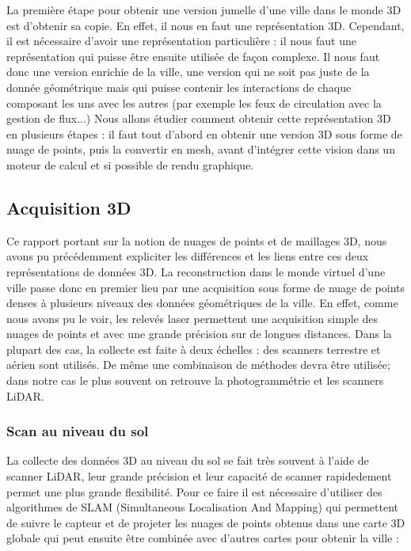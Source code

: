 La première étape pour obtenir une version jumelle d'une ville dans le monde 3D est d'obtenir sa copie. En effet, il nous en faut une représentation 3D. Cependant, il est nécessaire d'avoir une représentation particulière : il nous faut une représentation qui puisse être ensuite utilisée de façon complexe. Il nous faut donc une version enrichie de la ville, une version qui ne soit pas juste de la donnée géométrique mais qui puisse contenir les interactions de chaque composant les uns avec les autres (par exemple les feux de circulation avec la gestion de flux...)
Nous allons étudier comment obtenir cette représentation 3D en plusieurs étapes : il faut tout d'abord en obtenir une version 3D sous forme de nuage de points, puis la convertir en mesh, avant d'intégrer cette vision dans un moteur de calcul et si possible de rendu graphique.

\subsection{Acquisition 3D}
Ce rapport portant sur la notion de nuages de points et de maillages 3D, nous avons pu précédemment expliciter les différences et les liens entre ces deux représentations de données 3D. La reconstruction dans le monde virtuel d'une ville passe donc en premier lieu par une acquisition sous forme de nuage de points denses à plusieurs niveaux des données géométriques de la ville. En effet, comme nous avons pu le voir, les relevés laser permettent une acquisition simple des nuages de points et avec une grande précision sur de longues distances.
Dans la plupart des cas, la collecte est faite à deux échelles : des scanners terrestre et aérien sont utilisés. De même une combinaison de méthodes devra être utilisée; dans notre cas le plus souvent on retrouve la photogrammétrie et les scanners LiDAR.

\subsubsection{Scan au niveau du sol}
La collecte des données 3D au niveau du sol se fait très souvent à l'aide de scanner LiDAR, leur grande précision et  leur capacité de scanner rapidedement permet une plus grande flexibilité. Pour ce faire il est nécessaire d'utiliser des algorithmes de SLAM (Simultaneous Localisation And Mapping) \cite{LOAM} qui permettent de suivre le capteur et de projeter les nuages de points obtenus dans une carte 3D globale qui peut ensuite être combinée avec d'autres cartes pour obtenir la ville :

